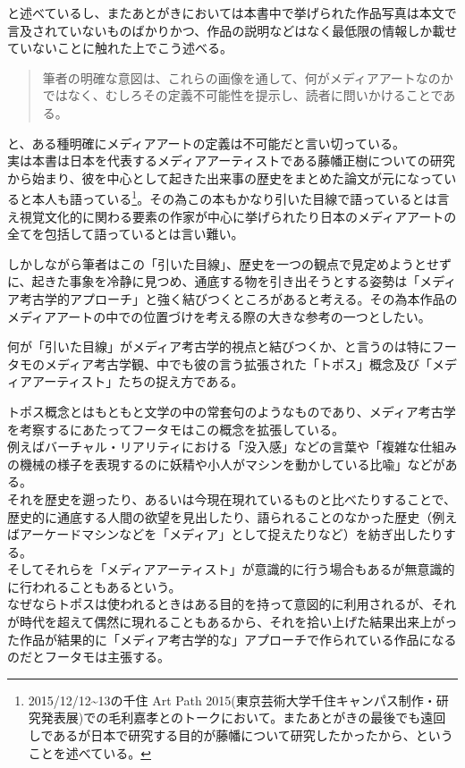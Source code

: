 \documentclass[a4paper,report]{jsbook}
\begin{document}
と述べているし、またあとがきにおいては本書中で挙げられた作品写真は本文で言及されていないものばかりかつ、作品の説明などはなく最低限の情報しか載せていないことに触れた上でこう述べる。

\begin{quote}
筆者の明確な意図は、これらの画像を通して、何がメディアアートなのかではなく、むしろその定義不可能性を提示し、読者に問いかけることである。
\end{quote}

と、ある種明確にメディアアートの定義は不可能だと言い切っている。\\
実は本書は日本を代表するメディアアーティストである藤幡正樹についての研究から始まり、彼を中心として起きた出来事の歴史をまとめた論文が元になっていると本人も語っている\footnote{2015/12/12\textasciitilde{}13の千住
  Art Path
  2015(東京芸術大学千住キャンパス制作・研究発表展)での毛利嘉孝とのトークにおいて。またあとがきの最後でも遠回しであるが日本で研究する目的が藤幡について研究したかったから、ということを述べている。}。その為この本もかなり引いた目線で語っているとは言え視覚文化的に関わる要素の作家が中心に挙げられたり日本のメディアアートの全てを包括して語っているとは言い難い。

しかしながら筆者はこの「引いた目線」、歴史を一つの観点で見定めようとせずに、起きた事象を冷静に見つめ、通底する物を引き出そうとする姿勢は「メディア考古学的アプローチ」と強く結びつくところがあると考える。その為本作品のメディアアートの中での位置づけを考える際の大きな参考の一つとしたい。

何が「引いた目線」がメディア考古学的視点と結びつくか、と言うのは特にフータモのメディア考古学観、中でも彼の言う拡張された「トポス」概念及び「メディアアーティスト」たちの捉え方である。

トポス概念とはもともと文学の中の常套句のようなものであり、メディア考古学を考察するにあたってフータモはこの概念を拡張している。\\
例えばバーチャル・リアリティにおける「没入感」などの言葉や「複雑な仕組みの機械の様子を表現するのに妖精や小人がマシンを動かしている比喩」などがある。\\
それを歴史を遡ったり、あるいは今現在現れているものと比べたりすることで、歴史的に通底する人間の欲望を見出したり、語られることのなかった歴史（例えばアーケードマシンなどを「メディア」として捉えたりなど）を紡ぎ出したりする。\\
そしてそれらを「メディアアーティスト」が意識的に行う場合もあるが無意識的に行われることもあるという。\\
なぜならトポスは使われるときはある目的を持って意図的に利用されるが、それが時代を超えて偶然に現れることもあるから、それを拾い上げた結果出来上がった作品が結果的に「メディア考古学的な」アプローチで作られている作品になるのだとフータモは主張する。
\end{document}

